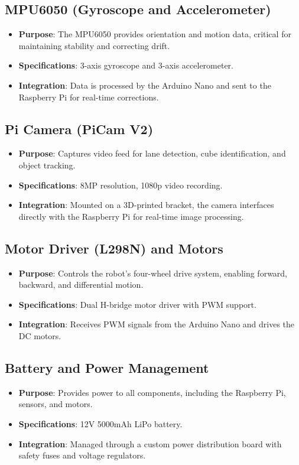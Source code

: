 \documentclass[12pt,a4paper]{article}
\begin{document}
\subsection{MPU6050 (Gyroscope and Accelerometer)}
\begin{itemize}
    \item \textbf{Purpose}: The MPU6050 provides orientation and motion data, critical for maintaining stability and correcting drift.
    \item \textbf{Specifications}: 3-axis gyroscope and 3-axis accelerometer.
    \item \textbf{Integration}: Data is processed by the Arduino Nano and sent to the Raspberry Pi for real-time corrections.
\end{itemize}

\subsection{Pi Camera (PiCam V2)}
\begin{itemize}
    \item \textbf{Purpose}: Captures video feed for lane detection, cube identification, and object tracking.
    \item \textbf{Specifications}: 8MP resolution, 1080p video recording.
    \item \textbf{Integration}: Mounted on a 3D-printed bracket, the camera interfaces directly with the Raspberry Pi for real-time image processing.
\end{itemize}

\subsection{Motor Driver (L298N) and Motors}
\begin{itemize}
    \item \textbf{Purpose}: Controls the robot’s four-wheel drive system, enabling forward, backward, and differential motion.
    \item \textbf{Specifications}: Dual H-bridge motor driver with PWM support.
    \item \textbf{Integration}: Receives PWM signals from the Arduino Nano and drives the DC motors.
\end{itemize}

\subsection{Battery and Power Management}
\begin{itemize}
    \item \textbf{Purpose}: Provides power to all components, including the Raspberry Pi, sensors, and motors.
    \item \textbf{Specifications}: 12V 5000mAh LiPo battery.
    \item \textbf{Integration}: Managed through a custom power distribution board with safety fuses and voltage regulators.
\end{itemize}
\end{document}
